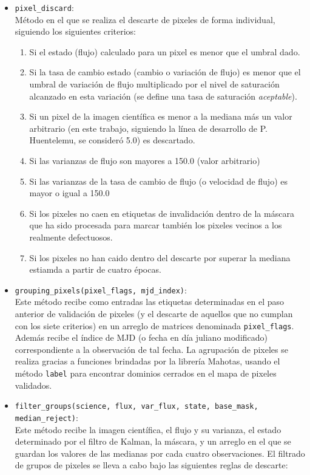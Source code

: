 \begin{itemize}
\item \texttt{pixel\_discard}:\\
M\'etodo en el que se realiza el descarte de pixeles de forma individual, siguiendo los siguientes criterios:
\begin{enumerate}
\item Si el estado (flujo) calculado para un pixel es menor que el umbral dado.
\item Si la tasa de cambio estado (cambio o variaci\'on de flujo) es menor que el umbral de variaci\'on de flujo multiplicado por el nivel de saturaci\'on alcanzado en esta variaci\'on (se define una tasa de saturaci\'on \textit{aceptable}).
\item Si un pixel de la imagen cient\'ifica es menor a la mediana m\'as un valor arbitrario (en este trabajo, siguiendo la l\'inea de desarrollo de P. Huentelemu, se consider\'o 5.0) es descartado.
\item Si las varianzas de flujo son mayores a 150.0 (valor arbitrario) 
\item Si las varianzas de la tasa de cambio de flujo (o velocidad de flujo) es mayor o igual a 150.0
\item Si los pixeles no caen en etiquetas de invalidaci\'on dentro de la m\'ascara que ha sido procesada para marcar tambi\'en los pixeles vecinos a los realmente defectuosos.
\item Si los pixeles no han caido dentro del descarte por superar la mediana estiamda a partir de cuatro \'epocas. 
\end{enumerate}
\item \texttt{grouping\_pixels(pixel\_flags, mjd\_index)}:\\
Este m\'etodo recibe como entradas las etiquetas determinadas en el paso anterior de validaci\'on de pixeles (y el descarte de aquellos que no cumplan con los siete criterios) en un arreglo de matrices denominada \texttt{pixel\_flags}. Adem\'as recibe el \'indice de MJD (o fecha en d\'ia juliano modificado) correspondiente a la observaci\'on de tal fecha.
La agrupaci\'on de pixeles se realiza gracias a funciones brindadas por la librer\'ia \textsf{Mahotas}, usando el m\'etodo \texttt{label} para encontrar dominios cerrados en el mapa de pixeles validados.
\bigskip

\item \texttt{filter\_groups(science, flux, var\_flux, state, base\_mask, median\_reject)}:\\
Este m\'etodo recibe la imagen cient\'ifica, el flujo y su varianza, el estado determinado por el filtro de Kalman, la m\'ascara, y un arreglo en el que se guardan los valores de las medianas por cada cuatro observaciones. 
El filtrado de grupos de pixeles se lleva a cabo bajo las siguientes reglas de descarte: 


\end{itemize}
